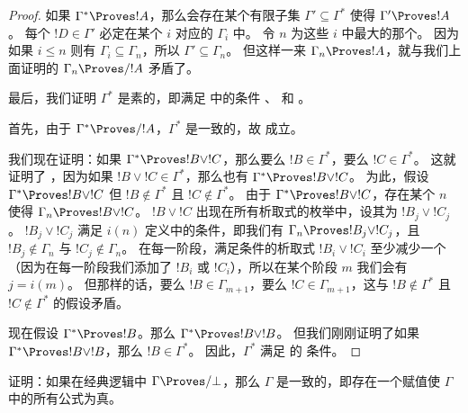 \documentclass[../../../include/open-logic-section]{subfiles}
\begin{document}
\begin{proof}
  如果 $\Gamma^* \Proves !A$，那么会存在某个有限子集 $\Gamma' \subseteq \Gamma^*$ 使得 $\Gamma' \Proves !A$。
  每个 $!D \in \Gamma'$ 必定在某个 $i$ 对应的 $\Gamma_i$ 中。
  令 $n$ 为这些 $i$ 中最大的那个。
  因为如果 $i \le n$ 则有 $\Gamma_i \subseteq \Gamma_n$，所以 $\Gamma' \subseteq \Gamma_n$。
  但这样一来 $\Gamma_n \Proves !A$，就与我们上面证明的 $\Gamma_n \Proves/ !A$ 矛盾了。

  最后，我们证明 $\Gamma^*$ 是素的，即满足  中的条件 、 和 。

  首先，由于 $\Gamma^* \Proves/ !A$，$\Gamma^*$ 是一致的，故  成立。

  我们现在证明：如果 $\Gamma^* \Proves !B \lor !C$，那么要么 $!B \in \Gamma^*$，要么 $!C \in \Gamma^*$。
  这就证明了 ，因为如果 $!B \lor !C \in \Gamma^*$，那么也有 $\Gamma^* \Proves !B \lor !C$。
  为此，假设 $\Gamma^* \Proves !B \lor !C$ 但 $!B \notin \Gamma^*$ 且 $!C \notin \Gamma^*$。
  由于 $\Gamma^* \Proves !B \lor !C$，存在某个 $n$ 使得 $\Gamma_n \Proves !B \lor !C$。
  $!B \lor !C$ 出现在所有析取式的枚举中，设其为 $!B_j \lor !C_j$。
  $!B_j \lor !C_j$ 满足 $i(n)$ 定义中的条件，即我们有 $\Gamma_n \Proves !B_j
  \lor !C_j$，且 $!B_j \notin \Gamma_n$ 与 $!C_j \notin \Gamma_n$。
  在每一阶段，满足条件的析取式 $!B_i \lor !C_i$ 至少减少一个（因为在每一阶段我们添加了 $!B_i$ 或 $!C_i$），所以在某个阶段 $m$ 我们会有 $j = i(m)$。
  但那样的话，要么 $!B \in \Gamma_{m+1}$，要么 $!C \in \Gamma_{m+1}$，这与 $!B \notin \Gamma^*$ 且 $!C \notin \Gamma^*$ 的假设矛盾。

  现在假设 $\Gamma^* \Proves !B$。那么 $\Gamma^* \Proves !B \lor !B$。
  但我们刚刚证明了如果 $\Gamma^* \Proves !B \lor !B$，那么 $!B \in \Gamma^*$。
  因此，$\Gamma^*$ 满足  的  条件。
\end{proof}

\begin{prob}
证明：如果在经典逻辑中 $\Gamma \Proves/ \bot$，那么 $\Gamma$ 是一致的，即存在一个赋值使 $\Gamma$ 中的所有公式为真。
\end{prob}
\end{document}
